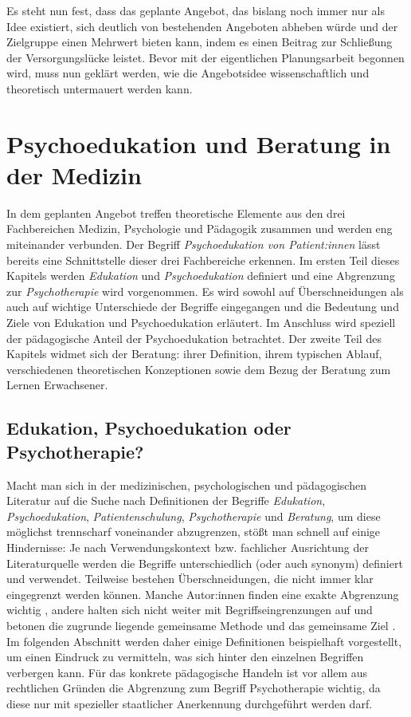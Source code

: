 \documentclass[
  twoside,
  parskip=half-,
]{scrreprt}
\begin{document}
Es steht nun fest, dass das geplante Angebot, das bislang noch immer nur als Idee existiert, sich deutlich von bestehenden Angeboten abheben würde und der Zielgruppe einen Mehrwert bieten kann, indem es einen Beitrag zur Schließung der Versorgungslücke leistet. Bevor mit der eigentlichen Planungsarbeit begonnen wird, muss nun geklärt werden, wie die Angebotsidee wissenschaftlich und theoretisch untermauert werden kann.


\chapter{Psychoedukation und Beratung in der Medizin}\label{psychoedukation}
In dem geplanten Angebot treffen theoretische Elemente aus den drei Fachbereichen Medizin, Psychologie und Pädagogik zusammen und werden eng miteinander verbunden. Der Begriff \textit{Psychoedukation von Patient:innen} lässt bereits eine Schnittstelle dieser drei Fachbereiche erkennen. Im ersten Teil dieses Kapitels werden \textit{Edukation} und \textit{Psychoedukation} definiert und eine Abgrenzung zur \textit{Psychotherapie} wird vorgenommen. Es wird sowohl auf Überschneidungen als auch auf wichtige Unterschiede der Begriffe eingegangen und die Bedeutung und Ziele von Edukation und Psychoedukation erläutert. Im Anschluss wird speziell der pädagogische Anteil der Psychoedukation betrachtet. Der zweite Teil des Kapitels widmet sich der Beratung: ihrer Definition, ihrem typischen Ablauf, verschiedenen theoretischen Konzeptionen sowie dem Bezug der Beratung zum Lernen Erwachsener.

\section{Edukation, Psychoedukation oder Psychotherapie?}

Macht man sich in der medizinischen, psychologischen und pädagogischen Literatur auf die Suche nach Definitionen der Begriffe \textit{Edukation}, \textit{Psychoedukation}, \textit{Patientenschulung}, \textit{Psychotherapie} und \textit{Beratung}, um diese möglichst trennscharf voneinander abzugrenzen, stößt man schnell auf einige Hindernisse: Je nach Verwendungskontext bzw. fachlicher Ausrichtung der Literaturquelle werden die Begriffe unterschiedlich (oder auch synonym) definiert und verwendet. Teilweise bestehen Überschneidungen, die nicht immer klar eingegrenzt werden können. Manche Autor:innen finden eine exakte Abgrenzung wichtig \autocite[vgl.][897]{integrativePsycho}, andere halten sich nicht weiter mit Begriffseingrenzungen auf und betonen die zugrunde liegende gemeinsame Methode und das gemeinsame Ziel \autocite[vgl.][17]{rogers1942}. Im folgenden Abschnitt werden daher einige Definitionen beispielhaft vorgestellt, um einen Eindruck zu vermitteln, was sich hinter den einzelnen Begriffen verbergen kann. Für das konkrete pädagogische Handeln ist vor allem aus rechtlichen Gründen die Abgrenzung zum Begriff Psychotherapie wichtig, da diese nur mit spezieller staatlicher Anerkennung durchgeführt werden darf.
\end{document}
